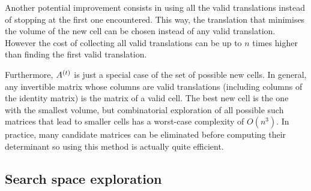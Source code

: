 \documentclass[main.tex]{subfiles}
\begin{document}
Another potential improvement consists in using all the valid translations instead of stopping at the first one encountered. This way, the translation that minimises the volume of the new cell can be chosen instead of any valid translation. However the cost of collecting all valid translations can be up to $n$ times higher than finding the first valid translation.

Furthermore, $A^{\left(t\right)}$ is just a special case of the set of possible new cells. In general, any invertible matrix whose columns are valid translations (including columns of the identity matrix) is the matrix of a valid cell. The best new cell is the one with the smallest volume, but combinatorial exploration of all possible such matrices that lead to smaller cells has a worst-case complexity of $O(n^3)$. In practice, many candidate matrices can be eliminated before computing their determinant so using this method is actually quite efficient.



% 
%
%


\subsection{Search space exploration}
\end{document}
